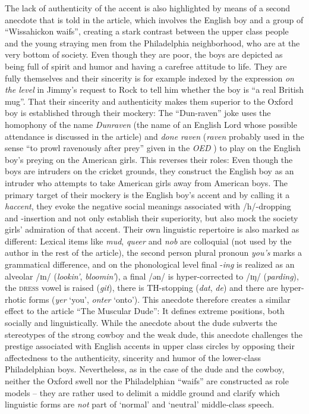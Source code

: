 The lack of authenticity of the accent is also highlighted by means of a second anecdote that is told in the article, which involves the English boy and a group of “Wissahickon waifs”, creating a stark contrast between the upper class people and the young straying men from the Philadelphia neighborhood, who are at the very bottom of society. Even though they are poor, the boys are depicted as being full of spirit and humor and having a carefree attitude to life. They are fully themselves and their sincerity is for example indexed by the expression \emph{on the level} in Jimmy’s request to Rock to tell him whether the boy is “a real British mug”. That their sincerity and authenticity makes them superior to the Oxford boy is established through their mockery: The “Dun-raven” joke uses the homophony of the name \emph{Dunraven} (the name of an English Lord whose possible attendance is discussed in the article) and \emph{done raven} (\emph{raven} probably used in the sense “to prowl ravenously after prey” given in the \emph{OED} \citeyear{raven}) to play on the English boy’s preying on the American girls. This reverses their roles: Even though the boys are intruders on the cricket grounds, they construct the English boy as an intruder who attempts to take American girls away from American boys. The primary target of their mockery is the English boy’s accent and by calling it a \emph{haccent}, they evoke the negative social meanings associated with /h/-dropping and -insertion and not only establish their superiority, but also mock the society girls’ admiration of that accent. Their own linguistic repertoire is also marked as different: Lexical items like \emph{mud}, \emph{queer} and \emph{nob} are colloquial (not used by the author in the rest of the article), the second person plural pronoun \emph{you’s} marks a grammatical difference, and on the phonological level final -\emph{ing} is realized as an alveolar /ɪn/ (\emph{lookin’}, \emph{bloomin’}), a final /ən/ is hyper-corrected to /ɪŋ/ (\emph{parding}), the \textsc{dress} vowel is raised (\emph{git}), there is TH-stopping (\emph{dat}, \emph{de}) and there are hyper-rhotic forms (\emph{yer} ‘you’, \emph{onter} ‘onto’). This anecdote therefore creates a similar effect to the article “The Muscular Dude”: It defines extreme positions, both socially and linguistically. While the anecdote about the dude subverts the stereotypes of the strong cowboy and the weak dude, this anecdote challenges the prestige associated with English accents in upper class circles by opposing their affectedness to the authenticity, sincerity and humor of the lower-class Philadelphian boys. Nevertheless, as in the case of the dude and the cowboy, neither the Oxford swell nor the Philadelphian “waifs” are constructed as role models – they are rather used to delimit a middle ground and clarify which linguistic forms are \emph{not} part of ‘normal’ and ‘neutral’ middle-class speech.

